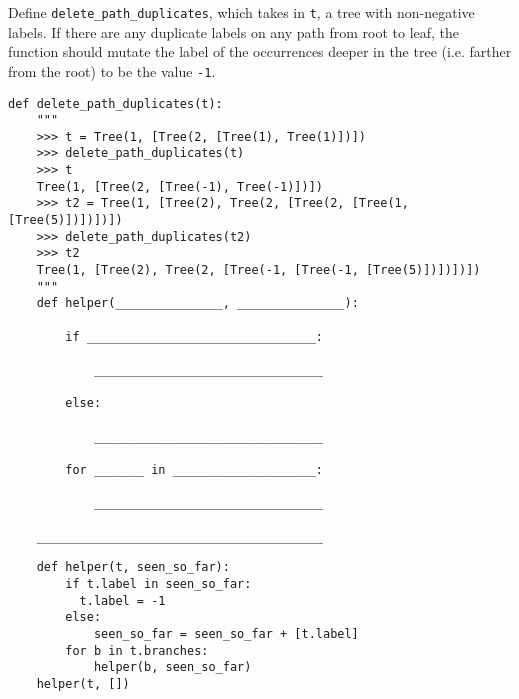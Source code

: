 
\question
Define \texttt{delete\_path\_duplicates}, which takes in \texttt{t}, a tree
with non-negative labels. If there are any duplicate labels on any path
from root to leaf, the function should mutate the label of the occurrences
deeper in the tree (i.e. farther from the root) to be the value \texttt{-1}.

\begin{lstlisting}
def delete_path_duplicates(t):
    """
    >>> t = Tree(1, [Tree(2, [Tree(1), Tree(1)])])
    >>> delete_path_duplicates(t)
    >>> t
    Tree(1, [Tree(2, [Tree(-1), Tree(-1)])])
    >>> t2 = Tree(1, [Tree(2), Tree(2, [Tree(2, [Tree(1, [Tree(5)])])])])
    >>> delete_path_duplicates(t2)
    >>> t2
    Tree(1, [Tree(2), Tree(2, [Tree(-1, [Tree(-1, [Tree(5)])])])])
    """
    def helper(_______________, _______________):

        if ________________________________:

            ________________________________

        else:

            ________________________________

        for _______ in ____________________:

            ________________________________

    ________________________________________

\end{lstlisting}

\begin{blocksection}
\begin{solution}
\begin{lstlisting}
    def helper(t, seen_so_far):
        if t.label in seen_so_far:
          t.label = -1
        else:
            seen_so_far = seen_so_far + [t.label]
        for b in t.branches:
            helper(b, seen_so_far)
    helper(t, [])
\end{lstlisting}
\end{solution}
\end{blocksection}

